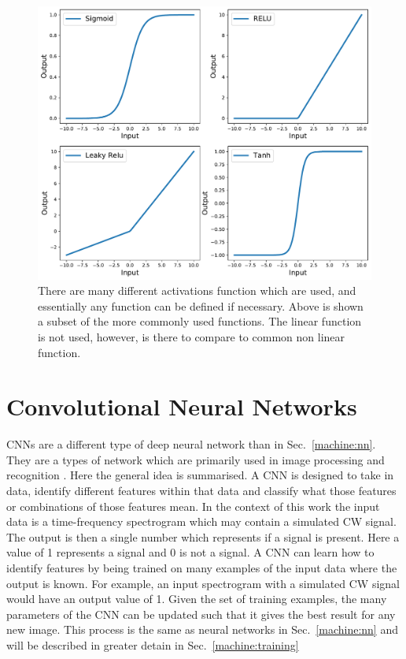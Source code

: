 \begin{figure}[h]
	\centering
	\includegraphics[width=0.8\columnwidth]{C4_cnn/activations.pdf}
	\caption[Examples of activation functions.]{There are many different activations function which are used, and essentially any function can be defined if necessary. Above is shown a subset of the more commonly used functions. The linear function is not used, however, is there to compare to common non linear function.}
	\label{machine:nn:activation:plot}
\end{figure}





\section{\label{machine:cnn}Convolutional Neural Networks}

\glspl{CNN} are a different type of deep neural network than in Sec.~\ref{machine:nn}.
They are a types of network which are primarily used in image
processing and recognition
\cite{lecun2015DeepLearning,lecun1998GradientbasedLearning,waibel1989PhonemeRecognition,krizhevsky2012ImageNetClassificationa}.
Here the general idea is summarised. 
A \gls{CNN} is designed to take in data, identify different features within that data and classify
what those features or combinations of those features mean.
In the context of this work the input data is a time-frequency spectrogram which may contain a simulated \gls{CW} signal.
The output is then a single number which represents if a signal is present.
Here a value of 1 represents a signal and 0 is not a signal.
A \gls{CNN} can learn how to identify features by being trained on many
examples of the input data where the output is known.
For example, an input spectrogram with a simulated \gls{CW} signal would have an output value of 1.
Given the set of training examples, the many parameters of the \gls{CNN} can
be updated such that it gives the best result for any new image. 
This process is the same as neural networks in Sec.~\ref{machine:nn} and will be described in greater detain in Sec.~\ref{machine:training}

